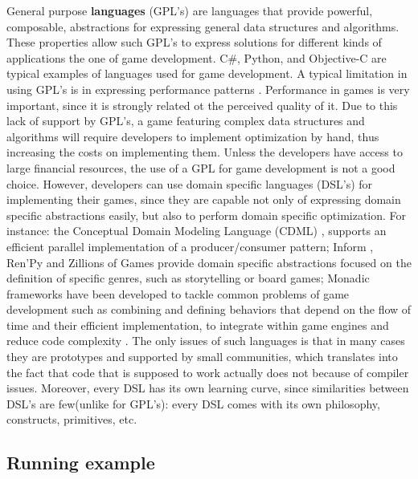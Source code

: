 General purpose \textbf{languages} (GPL's) are languages that provide powerful, composable, abstractions for expressing general data structures and algorithms. These properties allow such GPL's to express solutions for different kinds of applications the one of game development. C\#, Python, and Objective-C are typical examples of languages used for game development. A typical limitation in using GPL's is in expressing performance patterns \cite{cheung2015bridging}. Performance in games is very important, since it is strongly related ot the perceived quality of it. Due to this lack of support by GPL's, a game featuring complex data structures and algorithms will require developers to implement optimization by hand, thus increasing the costs on implementing them. Unless the developers have access to large financial resources, the use of a GPL for game development is not a good choice. However, developers can use domain specific languages (DSL's) for implementing their games, since they are capable not only of expressing domain specific abstractions easily, but also to perform domain specific optimization. For instance: the Conceptual Domain Modeling Language (CDML) \cite{best2009searching}, supports an efficient parallel implementation of a producer/consumer pattern; Inform \cite{reed2010creating}, Ren'Py \cite{fatemi2014cross} and Zillions of Games \cite{mallett1998zillions} provide domain specific abstractions focused on the definition of specific genres, such as storytelling or board games; Monadic frameworks have been developed to tackle common problems of game development such as combining and defining behaviors that depend on the flow of time and their efficient implementation, to integrate within game engines \cite{maggiore2011monadic} and reduce code complexity \cite{tabareau2013typed}. The only issues of such languages is that in many cases they are prototypes and supported by small communities, which translates into the fact that code that is supposed to work actually does not because of compiler issues. Moreover, every DSL has its own learning curve, since similarities between DSL's are few(unlike for GPL's): every DSL comes with its own philosophy, constructs, primitives, etc.


\subsection{Running example}


